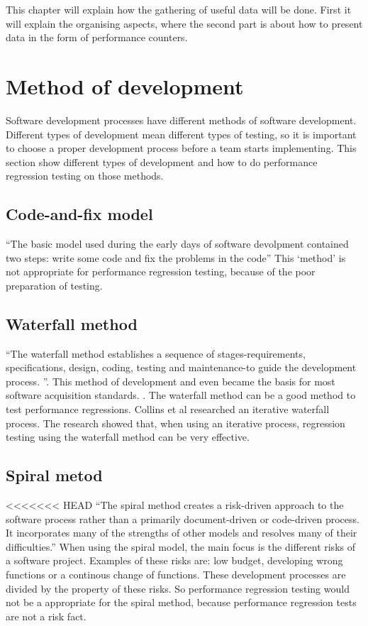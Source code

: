 This chapter will explain how the gathering of useful data will be done. First it will explain the organising aspects, where the second part is about how to present data in the form of performance counters.
\section{Method of development}
Software development processes have different methods of software development. Different types of development mean different types of testing, so it is important to choose a proper development process before a team starts implementing. This section show different types of development and how to do performance regression testing on those methods.
\subsection{Code-and-fix model}
``The basic model used during the early days of software devolpment contained two steps: write some code and fix the problems in the code'' \cite{boehm1988spiral} This `method' is not appropriate for performance regression testing, because of the poor preparation of testing. 

\subsection{Waterfall method}
``The waterfall method establishes a sequence of stages-requirements, specifications, design, coding, testing and maintenance-to guide the development process. ''\cite{kang1989software}. This method of development and even became the basis for most software acquisition standards. \cite{boehm1988spiral}. The waterfall method can be a good method to test performance regressions. Collins et al researched an iterative waterfall process. \cite{collins2010iterative} The research showed that, when using an iterative process, regression testing using the waterfall method can be very effective. 
\subsection{Spiral metod}
<<<<<<< HEAD
``The spiral method creates a risk-driven approach to the software process rather than a primarily document-driven or code-driven process. It incorporates many of the strengths
of other models and resolves many of their
difficulties.''\cite{boehm1988spiral} When using the spiral model, the main focus is the different risks of a software project. Examples of these risks are: low budget, developing wrong functions or a continous change of functions. These development processes are divided by the property of these risks. So performance regression testing would not be a appropriate for the spiral method, because performance regression tests are not a risk fact.  
